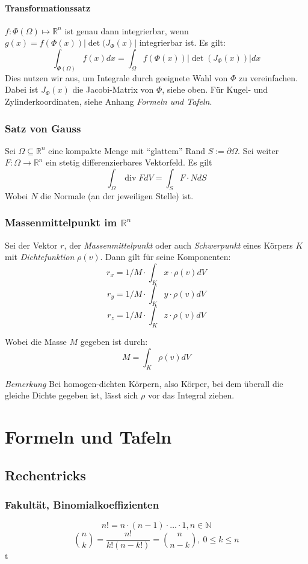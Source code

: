 \documentclass[a4paper, 9pt, DIV=24]{scrartcl}
\DeclareMathOperator{\Div}{div}
\newcommand{\N}{\mathbb{N}}
\newcommand{\R}{\mathbb{R}}
\begin{document}
\paragraph{Transformationssatz}
$f: \Phi(\Omega) \mapsto \R^n$ ist genau dann integrierbar, wenn $g(x) = f(\Phi(x))|\det(J_\Phi(x)|$ integrierbar ist.
Es gilt:
\[ \int_{\Phi(\Omega)} f(x)dx = \int_{\Omega} f(\Phi(x))|\det(J_\Phi(x))|dx\]
Dies nutzen wir aus, um Integrale durch geeignete Wahl von $\Phi$ zu vereinfachen.
Dabei ist $J_\Phi(x)$ die Jacobi-Matrix von $\Phi$, siehe oben.
Für Kugel- und Zylinderkoordinaten, siehe Anhang \emph{Formeln und Tafeln}.

\subsubsection{Satz von Gauss}
Sei $\Omega \subseteq \R^n$ eine kompakte Menge mit ``glattem'' Rand $S := \partial\Omega$.
Sei weiter $F: \Omega \rightarrow \R^n$ ein stetig differenzierbares Vektorfeld. Es gilt
\[ \int_\Omega \Div FdV = \int_S F\cdot N dS \]
Wobei $N$ die Normale (an der jeweiligen Stelle) ist.

\subsubsection{Massenmittelpunkt im $\R^n$}
Sei der Vektor $r$, der \emph{Massenmittelpunkt} oder auch \emph{Schwerpunkt} eines Körpers $K$ mit \emph{Dichtefunktion} $\rho(v)$.
Dann gilt für seine Komponenten:
\[ r_x = 1/M\cdot\int_K x\cdot \rho(v)dV \]
\[ r_y = 1/M\cdot\int_K y\cdot \rho(v)dV \]
\[ r_z = 1/M\cdot\int_K z\cdot \rho(v)dV \]

Wobei die Masse $M$ gegeben ist durch:
\[ M = \int_K \rho(v) dV \]

\emph{Bemerkung} Bei homogen-dichten Körpern, also Körper, bei dem überall die gleiche Dichte gegeben ist,
lässt sich $\rho$ vor das Integral ziehen.

\clearpage
\section{Formeln und Tafeln}
\subsection{Rechentricks}
\subsubsection{Fakultät, Binomialkoeffizienten}
\[ n! = n\cdot(n-1)\cdot\dots\cdot1, n\in\N \]
\[ \binom{n}{k} = \frac{n!}{k!(n-k!)} = \binom{n}{n-k},\ 0 \leq k \leq n \]
t
\end{document}
